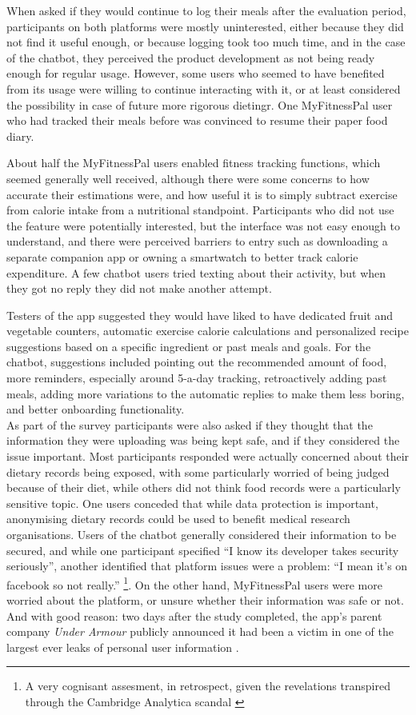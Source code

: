 When asked if they would continue to log their meals after the evaluation period, participants on both platforms were mostly uninterested, either because they did not find it useful enough, or because logging took too much time, and in the case of the chatbot, they perceived the product development as not being ready enough for regular usage. However, some users who seemed to have benefited from its usage were willing to continue interacting with it, or at least considered the possibility in case of future more rigorous dietingr. One MyFitnessPal user who had tracked their meals before was convinced to resume their paper food diary. 

About half the MyFitnessPal users enabled fitness tracking functions, which seemed generally well received, although there were some concerns to how accurate their estimations were, and how useful it is to simply subtract exercise from calorie intake from a nutritional standpoint. Participants who did not use the feature were potentially interested, but the interface was not easy enough to understand, and there were perceived barriers to entry such as downloading a separate companion app or owning a smartwatch to better track calorie expenditure. A few chatbot users tried texting about their activity, but when they got no reply they did not make another attempt.

Testers of the app suggested they would have liked to have dedicated fruit and vegetable counters, automatic exercise calorie calculations and personalized recipe suggestions based on a specific ingredient or past meals and goals. For the chatbot, suggestions included pointing out the recommended amount of food, more reminders, especially around 5-a-day tracking, retroactively adding past meals, adding more variations to the automatic replies to make them less boring, and better onboarding functionality. \\
As part of the survey participants were  also asked if they thought that the information they were uploading was being kept safe, and if they considered the issue important. Most participants responded were actually concerned about their dietary records being exposed, with some particularly worried of being judged because of their diet, while others did not think food records were a particularly sensitive topic. One users conceded that while data protection is important, anonymising dietary records could be used to benefit medical research organisations. Users of the chatbot generally considered their information to be secured, and while one participant specified ``I know its developer takes security seriously'', another identified that platform issues were a problem: ``I mean it's on facebook so not really.'' \footnote{A very cognisant assesment, in retrospect, given the revelations transpired through the Cambridge Analytica scandal \cite{cambridgeanalytica}}. On the other hand, MyFitnessPal users were more worried about the platform, or unsure whether their information was safe or not. And with good reason: two days after the study completed, the app's parent company \textit{Under Armour} publicly announced it had been a victim in one of the largest ever leaks of personal user information \cite{underarmour}.
